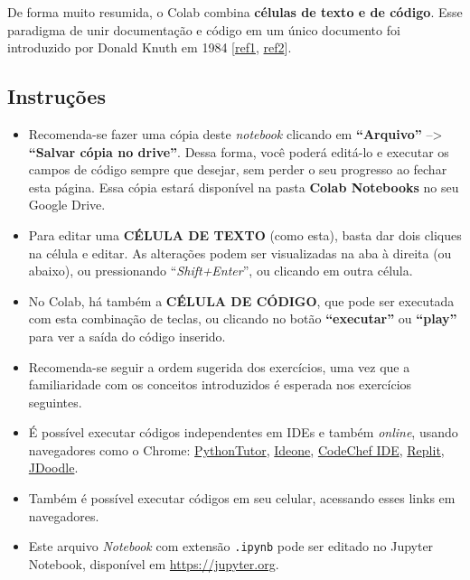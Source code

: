 \documentclass[12pt,a4paper]{article}
\providecommand{\tightlist}{%
      \setlength{\itemsep}{0pt}\setlength{\parskip}{0pt}}
\begin{document}
De forma muito resumida, o Colab combina \textbf{células de texto e de
código}. Esse paradigma de unir documentação e código em um único
documento foi introduzido por Donald Knuth em 1984
{[}\href{https://www-cs-faculty.stanford.edu/~knuth/}{ref1},
\href{http://www.literateprogramming.com}{ref2}{]}.

    \hypertarget{instruuxe7uxf5es}{%
\subsection{Instruções}\label{instruuxe7uxf5es}}

    \begin{itemize}
\tightlist
\item
  Recomenda-se fazer uma cópia deste \emph{notebook} clicando em
  \textbf{``Arquivo''} --\textgreater{} \textbf{``Salvar cópia no
  drive''}. Dessa forma, você poderá editá-lo e executar os campos de
  código sempre que desejar, sem perder o seu progresso ao fechar esta
  página. Essa cópia estará disponível na pasta \textbf{Colab Notebooks}
  no seu Google Drive.
\item
  Para editar uma \textbf{CÉLULA DE TEXTO} (como esta), basta dar dois
  cliques na célula e editar. As alterações podem ser visualizadas na
  aba à direita (ou abaixo), ou pressionando ``\emph{Shift+Enter}'', ou
  clicando em outra célula.
\item
  No Colab, há também a \textbf{CÉLULA DE CÓDIGO}, que pode ser
  executada com esta combinação de teclas, ou clicando no botão
  \textbf{``executar''} ou \textbf{``play''} para ver a saída do código
  inserido.
\item
  Recomenda-se seguir a ordem sugerida dos exercícios, uma vez que a
  familiaridade com os conceitos introduzidos é esperada nos exercícios
  seguintes.
\item
  É possível executar códigos independentes em IDEs e também
  \emph{online}, usando navegadores como o Chrome:
  \href{https://pythontutor.com}{PythonTutor},
  \href{https://ideone.com/}{Ideone},
  \href{https://www.codechef.com/ide}{CodeChef IDE},
  \href{https://replit.com/}{Replit},
  \href{https://www.jdoodle.com}{JDoodle}.
\item
  Também é possível executar códigos em seu celular, acessando esses
  links em navegadores.
\item
  Este arquivo \emph{Notebook} com extensão \texttt{.ipynb} pode ser
  editado no Jupyter Notebook, disponível em \url{https://jupyter.org}.
\end{itemize}
\end{document}
